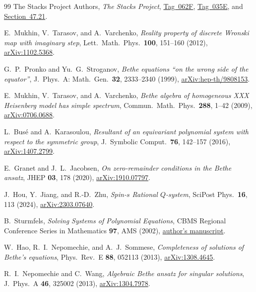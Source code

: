 \documentclass[11pt]{article}
\theoremstyle{definition}
\begin{document}
\begin{thebibliography}{99}
The Stacks Project Authors,
\emph{The Stacks Project},
\href{https://stacks.math.columbia.edu/tag/062F}{Tag~062F},
\href{https://stacks.math.columbia.edu/tag/035E}{Tag~035E}, and
\href{https://stacks.math.columbia.edu/tag/0DW6}{Section~47.21}.

E.~Mukhin, V.~Tarasov, and A.~Varchenko,
\emph{Reality property of discrete Wronski map with imaginary step},
Lett.\ Math.\ Phys.\ \textbf{100}, 151--160 (2012),
\href{https://arxiv.org/abs/1102.5368}{arXiv:1102.5368}.

G.~P.~Pronko and Yu.~G.~Stroganov,
\emph{Bethe equations ``on the wrong side of the equator''},
J.\ Phys.\ A: Math.\ Gen.\ \textbf{32}, 2333--2340 (1999),
\href{https://arxiv.org/abs/hep-th/9808153}{arXiv:hep-th/9808153}.

E.~Mukhin, V.~Tarasov, and A.~Varchenko,
\emph{Bethe algebra of homogeneous XXX Heisenberg model has simple spectrum},
Commun.\ Math.\ Phys.\ \textbf{288}, 1--42 (2009),
\href{https://arxiv.org/abs/0706.0688}{arXiv:0706.0688}.

L.~Bus\'e and A.~Karasoulou,
\emph{Resultant of an equivariant polynomial system with respect to the symmetric group},
J.\ Symbolic Comput.\ \textbf{76}, 142--157 (2016),
\href{https://arxiv.org/abs/1407.2799}{arXiv:1407.2799}.

E.~Granet and J.~L.~Jacobsen,
\emph{On zero-remainder conditions in the Bethe ansatz},
JHEP \textbf{03}, 178 (2020),
\href{https://arxiv.org/abs/1910.07797}{arXiv:1910.07797}.

J.~Hou, Y.~Jiang, and R.-D.~Zhu,
\emph{Spin-$s$ Rational $Q$-system},
SciPost Phys.\ \textbf{16}, 113 (2024),
\href{https://arxiv.org/abs/2303.07640}{arXiv:2303.07640}.

B.~Sturmfels,
\emph{Solving Systems of Polynomial Equations},
CBMS Regional Conference Series in Mathematics \textbf{97}, AMS (2002),
\href{https://web.math.berkeley.edu/~bernd/cbms.pdf}{author's manuscript}.

W.~Hao, R.~I.~Nepomechie, and A.~J.~Sommese,
\emph{Completeness of solutions of Bethe's equations},
Phys.\ Rev.\ E \textbf{88}, 052113 (2013),
\href{https://arxiv.org/abs/1308.4645}{arXiv:1308.4645}.

R.~I.~Nepomechie and C.~Wang,
\emph{Algebraic Bethe ansatz for singular solutions},
J.\ Phys.\ A \textbf{46}, 325002 (2013),
\href{https://arxiv.org/abs/1304.7978}{arXiv:1304.7978}.

\end{thebibliography}
\end{document}
